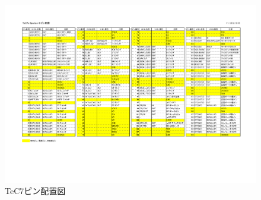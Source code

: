 \newpage
\begin{figure}[btph]
\begin{center}
\includegraphics[angle=90, width=12.5cm]
{appD/TeC7aPIN.pdf}
\caption{TeC7ピン配置図}
\end{center}
\end{figure}


